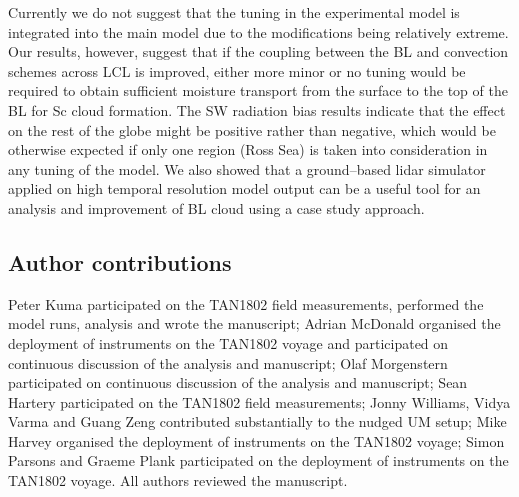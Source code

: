 
Currently we do not suggest that the tuning in the experimental model is
integrated into the main model due to the modifications being relatively
extreme. Our results, however, suggest that if the
coupling between the BL and convection schemes across LCL is improved,
either more minor or no tuning would be required to obtain sufficient moisture
transport from the surface to the top of the BL for Sc cloud formation.
The SW radiation bias results indicate that the effect on the rest of the
globe might be positive rather than negative, which would be otherwise
expected if only one region (Ross Sea) is taken into consideration in any
tuning of the model. We also showed that a ground--based lidar simulator
applied on high temporal resolution model output can be a useful tool for an
analysis and improvement of BL cloud using a case study approach.



\small

\subsection*{Author contributions}

Peter Kuma participated on the TAN1802 field measurements, performed the model runs, analysis and wrote the manuscript;
Adrian McDonald organised the deployment of instruments on the TAN1802 voyage and participated on continuous discussion of the analysis
and manuscript;
Olaf Morgenstern participated on continuous discussion of the analysis and
manuscript;
Sean Hartery participated on the TAN1802 field measurements;
Jonny Williams, Vidya Varma and Guang Zeng contributed substantially to the
nudged UM setup;
Mike Harvey organised the deployment of instruments on the TAN1802 voyage;
Simon Parsons and Graeme Plank participated on the deployment of instruments on the TAN1802
voyage. All authors reviewed the manuscript.

